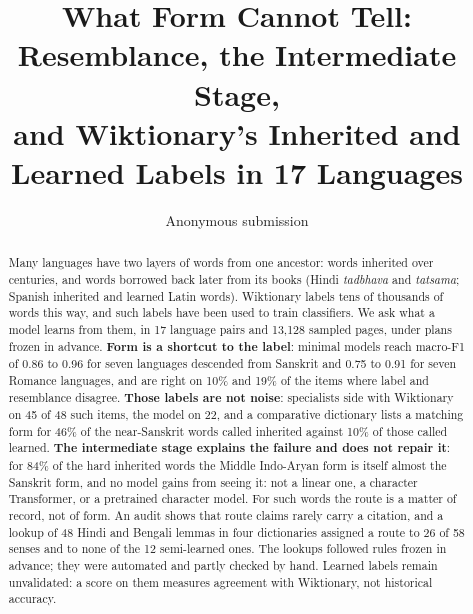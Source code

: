 \documentclass[11pt]{article}
\title{What Form Cannot Tell: Resemblance, the Intermediate Stage,\\and Wiktionary's Inherited and Learned Labels in 17 Languages}
\author{Anonymous submission}
\begin{document}
\maketitle

\begin{abstract}
Many languages have two layers of words from one ancestor: words inherited over centuries, and words borrowed back later from its books (Hindi \textit{tadbhava} and \textit{tatsama}; Spanish inherited and learned Latin words). Wiktionary labels tens of thousands of words this way, and such labels have been used to train classifiers. We ask what a model learns from them, in 17 language pairs and 13,128 sampled pages, under plans frozen in advance. \textbf{Form is a shortcut to the label}: minimal models reach macro-F1 of 0.86 to 0.96 for seven languages descended from Sanskrit and 0.75 to 0.91 for seven Romance languages, and are right on 10\% and 19\% of the items where label and resemblance disagree. \textbf{Those labels are not noise}: specialists side with Wiktionary on 45 of 48 such items, the model on 22, and a comparative dictionary lists a matching form for 46\% of the near-Sanskrit words called inherited against 10\% of those called learned. \textbf{The intermediate stage explains the failure and does not repair it}: for 84\% of the hard inherited words the Middle Indo-Aryan form is itself almost the Sanskrit form, and no model gains from seeing it: not a linear one, a character Transformer, or a pretrained character model. For such words the route is a matter of record, not of form. An audit shows that route claims rarely carry a citation, and a lookup of 48 Hindi and Bengali lemmas in four dictionaries assigned a route to 26 of 58 senses and to none of the 12 semi-learned ones. The lookups followed rules frozen in advance; they were automated and partly checked by hand. Learned labels remain unvalidated: a score on them measures agreement with Wiktionary, not historical accuracy.
\end{abstract}
\end{document}
